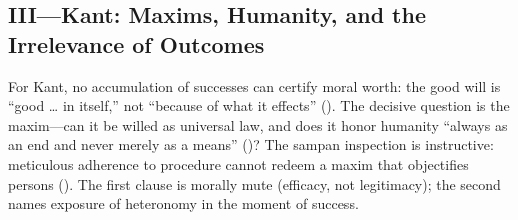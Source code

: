 \subsection*{III—Kant: Maxims, Humanity, and the Irrelevance of Outcomes}
\label{ssec:iii-kant}
For Kant, no accumulation of successes can certify moral worth: the good will is “good … in itself,” not “because of what it effects” (\parencite[p.~27]{KantCPrR1996}). The decisive question is the maxim—can it be willed as universal law, and does it honor humanity “always as an end and never merely as a means” (\parencite[pp.~27--33]{KantGroundwork1996})? The sampan inspection is instructive: meticulous adherence to procedure cannot redeem a maxim that objectifies persons (\parencite[pp.~30--33, 72--76]{KantCPrR1996}). The first clause is morally mute (efficacy, not legitimacy); the second names exposure of heteronomy in the moment of success.
